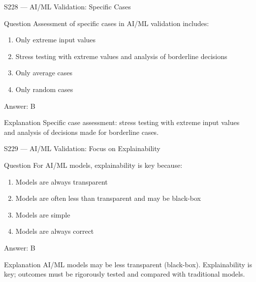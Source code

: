 \documentclass[aspectratio=169,8pt]{beamer}
\begin{document}
	\begin{frame}{S228 --- AI/ML Validation: Specific Cases}
		\begin{block}{Question}
			Assessment of specific cases in AI/ML validation includes:
			\begin{enumerate}
				\item Only extreme input values
				\item Stress testing with extreme values and analysis of borderline decisions
				\item Only average cases
				\item Only random cases
			\end{enumerate}
		\end{block}
		\begin{exampleblock}{Answer: B}\end{exampleblock}
		\begin{block}{Explanation}
			Specific case assessment: stress testing with extreme input values and analysis of decisions made for borderline cases.
		\end{block}
	\end{frame}
	
	\begin{frame}{S229 --- AI/ML Validation: Focus on Explainability}
		\begin{block}{Question}
			For AI/ML models, explainability is key because:
			\begin{enumerate}
				\item Models are always transparent
				\item Models are often less than transparent and may be black-box
				\item Models are simple
				\item Models are always correct
			\end{enumerate}
		\end{block}
		\begin{exampleblock}{Answer: B}\end{exampleblock}
		\begin{block}{Explanation}
			AI/ML models may be less transparent (black-box). Explainability is key; outcomes must be rigorously tested and compared with traditional models.
		\end{block}
	\end{frame}
	
\end{document}
